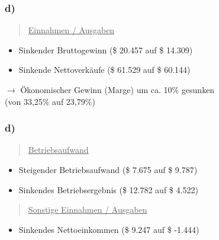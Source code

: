 \documentclass{beamer}
\begin{document}
\begin{frame}
\frametitle{d)}

\begin{quote}
\underline{Einnahmen / Ausgaben}
\end{quote}

\begin{itemize}
\item Sinkender Bruttogewinn (\$ 20.457 auf \$ 14.309)
\item Sinkende Nettoverk\"aufe (\$ 61.529 auf \$ 60.144)
\end{itemize}

$\rightarrow$ Ökonomischer Gewinn (Marge) um ca. 10\% gesunken \\ (von 33,25\% auf 23,79\%)

\end{frame}

\begin{frame}
\frametitle{d)}

\begin{quote}
\underline{Betriebsaufwand}
\end{quote}

\begin{itemize}
\item Steigender Betriebsaufwand (\$ 7.675 auf \$ 9.787)
\item Sinkendes Betriebsergebnis (\$ 12.782 auf \$ 4.522)
\end{itemize}

\begin{quote}
\underline{Sonstige Einnahmen / Ausgaben}
\end{quote}

\begin{itemize}
\item Sinkendes Nettoeinkommen (\$ 9.247 auf \$ -1.444)
\end{itemize}

\end{frame}
\end{document}
